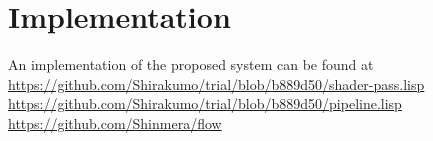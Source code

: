 \documentclass[format=sigconf]{acmart}
\begin{document}
\section{Implementation}\label{implementation}
An implementation of the proposed system can be found at \\
\url{https://github.com/Shirakumo/trial/blob/b889d50/shader-pass.lisp} \\
\url{https://github.com/Shirakumo/trial/blob/b889d50/pipeline.lisp} \\
\url{https://github.com/Shinmera/flow} \\


\end{document}
